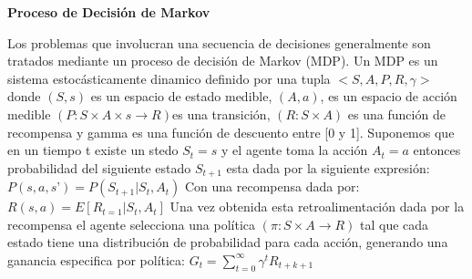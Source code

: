 \documentclass[12pt,letterpaper]{article}
\begin{document}
\textbf{Proceso de Decisión de Markov}
\newline 

Los problemas que involucran una secuencia de decisiones generalmente son tratados mediante un proceso de decisión de Markov (MDP). 
Un MDP es un sistema estocásticamente dinamico definido por una tupla $< S, A, P, R, \gamma > $  donde $(S,s)$ es un espacio de estado medible, $(A,a)$, es un espacio de acción medible $( P:S \times A \times s \rightarrow R )$es una transición, $(R:S \times A)$ es una función de recompensa y gamma es una función de descuento entre [0 y 1].  Suponemos que en un tiempo t existe un stedo $S_t = s$ y el agente toma la acción $A_t = a$ entonces probabilidad del siguiente estado $S_{t+1}$ esta dada por la siguiente expresión: 
\newline \newline
$ P(s,a,s’) = P(S_{t+1} | S_t,A_t)$ 
\newline \newline
Con una recompensa dada por: 
\newline
\newline 
$R(s,a) = E[R_{t=1}|S_t,A_t]$
\newline \newline
Una vez obtenida esta retroalimentación dada por la recompensa el agente selecciona una política $(\pi: S \times A\rightarrow R)$ tal que cada estado tiene una distribución de probabilidad para cada acción, generando una ganancia especifica por política: 
\newline
\newline 
$G_t= \sum\limits_{t=0}^\infty \gamma^t R_{t+k+1}$ 
\newline
\newline 
\end{document}
